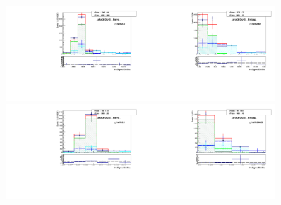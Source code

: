 \begin{figure}[htb]
  \begin{center}
   \includegraphics[width=0.45\textwidth]{../figs/figs_v11/MUON_WGamma/TemplateFits/c_TEMPL_SIHIH_UNblind__phoEt35to45__Barrel__RooFit_MCclosure.pdf}\includegraphics[width=0.45\textwidth]{../figs/figs_v11/MUON_WGamma/TemplateFits/c_TEMPL_SIHIH_UNblind__phoEt35to45__Endcap__RooFit_MCclosure.pdf}\\
   \includegraphics[width=0.45\textwidth]{../figs/figs_v11/MUON_WGamma/TemplateFits/c_TEMPL_SIHIH_UNblind__phoEt45to55__Barrel__RooFit_MCclosure.pdf}\includegraphics[width=0.45\textwidth]{../figs/figs_v11/MUON_WGamma/TemplateFits/c_TEMPL_SIHIH_UNblind__phoEt45to55__Endcap__RooFit_MCclosure.pdf}\\

\end{center}
\end{figure}
